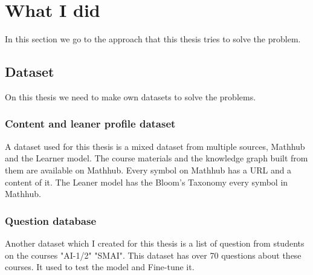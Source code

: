 \section{What I did}
In this section we go to the approach that this thesis tries to solve the problem.
\subsection{Dataset}
On this thesis we need to make own datasets to solve the problems.
\subsubsection{Content and leaner profile dataset}
A dataset used for this thesis is a mixed dataset from multiple sources, Mathhub and the Learner model.
The course materials and the knowledge graph built from them are available on Mathhub. Every symbol on Mathhub has a URL and a content of it.
The Leaner model has the Bloom’s Taxonomy every symbol in Mathhub.


\subsubsection{Question database}
Another dataset which I created for this thesis is a list of question from students on the courses "AI-1/2" "SMAI".
This dataset has over 70 questions about these courses. It used to test the model and Fine-tune it.




